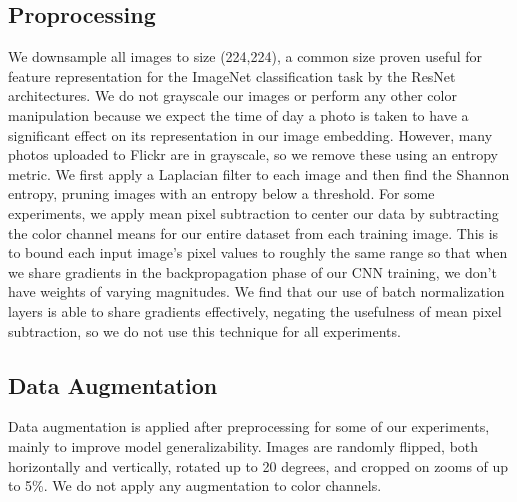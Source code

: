 

\subsection{Proprocessing}
We downsample all images to size (224,224), a common size proven useful for feature representation for the ImageNet classification task by the ResNet architectures.\cite{He2015} We do not grayscale our images or perform any other color manipulation because we expect the time of day a photo is taken to have a significant effect on its representation in our image embedding. However, many photos uploaded to Flickr are in grayscale, so we remove these using an entropy metric. We first apply a Laplacian filter to each image and then find the Shannon entropy, pruning images with an entropy below a threshold. For some experiments, we apply mean pixel subtraction to center our data by subtracting the color channel means for our entire dataset from each training image. This is to bound each input image's pixel values to roughly the same range so that when we share gradients in the backpropagation phase of our CNN training, we don't have weights of varying magnitudes. We find that our use of batch normalization layers is able to share gradients effectively, negating the usefulness of mean pixel subtraction, so we do not use this technique for all experiments.

\subsection{Data Augmentation}
Data augmentation is applied after preprocessing for some of our experiments, mainly to improve model generalizability. Images are randomly flipped, both horizontally and vertically,  rotated up to 20 degrees, and cropped on zooms of up to 5\%. We do not apply any augmentation to color channels. 

